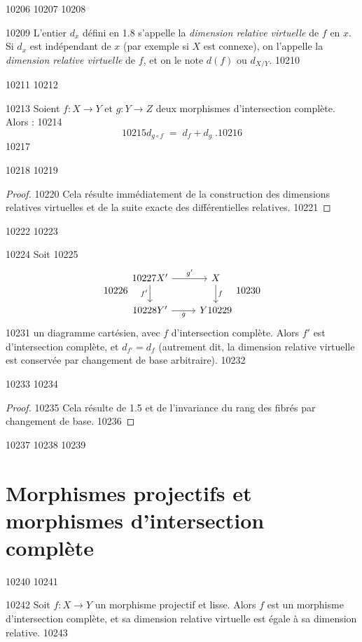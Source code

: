  10206	
 10207	
 10208	\begin{definition}[1.9]%
 10209	L'entier $d_x$ défini en 1.8 s'appelle la \emph{dimension relative virtuelle} de $f$ en $x$. Si $d_x$ est indépendant de $x$ (par exemple si $X$ est connexe), on l'appelle la \emph{dimension relative virtuelle} de $f$, et on le note $d(f)$ ou $d_{X/Y}$.
 10210	\end{definition}
 10211	
 10212	\begin{proposition}[1.10]%
 10213	Soient $f : X \to Y$ et $g : Y \to Z$ deux morphismes d'intersection complète. Alors :
 10214	\[
 10215	d_{g \circ f} \; = \; d_f + d_g\; .
 10216	\]
 10217	\end{proposition}
 10218	
 10219	\begin{proof}
 10220	Cela résulte immédiatement de la construction des dimensions relatives virtuelles et de la suite exacte des différentielles relatives.
 10221	\end{proof}
 10222	
 10223	\begin{proposition}[1.11]%
 10224	Soit
 10225	\[
 10226	\begin{tikzcd}
 10227	X' \arrow[r, "g'"] \arrow[d, "f'"'] & X \arrow[d, "f"] \\
 10228	Y' \arrow[r, "g"'] & Y
 10229	\end{tikzcd}
 10230	\]
 10231	un diagramme cartésien, avec $f$ d'intersection complète. Alors $f'$ est d'intersection complète, et $d_{f'} = d_f$ (autrement dit, la dimension relative virtuelle est conservée par changement de base arbitraire).
 10232	\end{proposition}
 10233	
 10234	\begin{proof}
 10235	Cela résulte de 1.5 et de l'invariance du rang des fibrés par changement de base.
 10236	\end{proof}
 10237	
 10238	
 10239	\section{Morphismes projectifs et morphismes d'intersection complète}
 10240	
 10241	\begin{proposition}[2.1]%
 10242	Soit $f : X \to Y$ un morphisme projectif et lisse. Alors $f$ est un morphisme d'intersection complète, et sa dimension relative virtuelle est égale à sa dimension relative.
 10243	\end{proposition}
